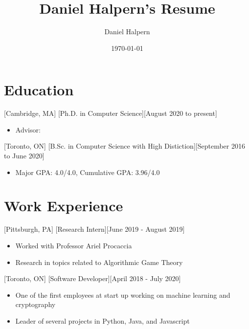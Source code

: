 \documentclass{article}
\title{Daniel Halpern's Resume}
\author{Daniel Halpern}
\date{\today}
\newcommand{\link}[2]{\iftoggle{uselinks}{\href{#1}{#2}}{#2}}
\begin{document}

    \makecvtitle %

    \section{Education}

    [Cambridge, MA]
    [Ph.D. in Computer Science][August 2020 to present]
    \begin{itemize}
        \item Advisor: \link{http://procaccia.info}{Ariel Procaccia}
    \end{itemize}

    [Toronto, ON]
    [B.Sc. in Computer Science with High Distiction][September 2016 to June 2020]
    \begin{itemize}
        \item Major GPA: 4.0/4.0, Cumulative GPA: 3.96/4.0
    \end{itemize}


    \section{Work Experience}
    [Pittsburgh, PA]
    [Research Intern][June 2019 - August 2019]
    \begin{itemize}
        \item Worked with Professor Ariel Procaccia
        \item Research in topics related to Algorithmic Game Theory
    \end{itemize}

    [Toronto, ON]
    [Software Developer][April 2018 - July 2020]
    \begin{itemize}[noitemsep,nolistsep]
        \item One of the first employees at start up working on machine learning and cryptography
        \item Leader of several projects in Python, Java, and Javascript
    \end{itemize}
\end{document}
